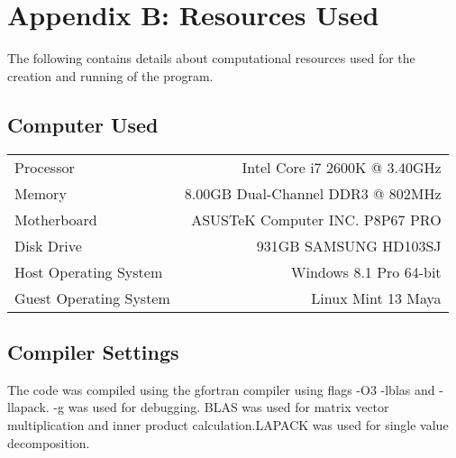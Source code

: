 
\chapter{Appendix B: Resources Used}
\label{app:resources}

The following contains details about computational resources used for the creation and running of the program.



\section{Computer Used}

\begin{tabular}{l | r
}
\hline
Processor	     & Intel Core i7 2600K @ 3.40GHz \\
Memory	         & 8.00GB Dual-Channel DDR3 @ 802MHz                                   \\
Motherboard      & ASUSTeK Computer INC. P8P67 PRO \\
Disk Drive       & 931GB SAMSUNG HD103SJ  \\
Host Operating System  & Windows 8.1 Pro 64-bit \\
Guest Operating System & Linux Mint 13 Maya                     \\
\hline
\end{tabular}

\section{Compiler Settings}


The code was compiled using the gfortran compiler using flags -O3 -lblas and -llapack. -g was used for debugging. BLAS was used for matrix vector multiplication and inner product calculation.LAPACK was used for single value decomposition.